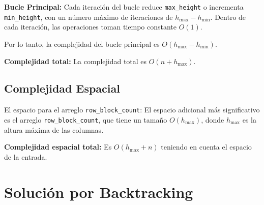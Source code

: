\documentclass[a4paper,12pt]{article}
\begin{document}
\textbf{Bucle Principal:}
Cada iteración del bucle reduce \texttt{max\_height} o incrementa \texttt{min\_height}, con un número máximo de iteraciones de \(h_{\text{max}} - h_{\text{min}}\). Dentro de cada iteración, las operaciones toman tiempo constante \(O(1)\).

Por lo tanto, la complejidad del bucle principal es \(O(h_{\text{max}} - h_{\text{min}})\).

\textbf{Complejidad total:} La complejidad total es \(O(n + h_{\text{max}})\).

\subsection{Complejidad Espacial}

El espacio para el arreglo \texttt{row\_block\_count}:
El espacio adicional más significativo es el arreglo \texttt{row\_block\_count}, que tiene un tamaño \(O(h_{\text{max}})\), donde \(h_{\text{max}}\) es la altura máxima de las columnas.

\textbf{Complejidad espacial total:}
Es \(O(h_{\text{max}} + n)\) teniendo en cuenta el espacio de la entrada.


\section{Solución por Backtracking}
\end{document}

